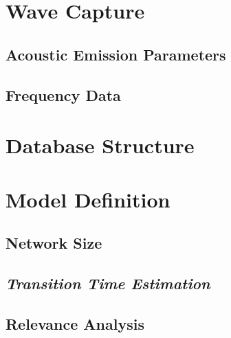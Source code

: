 \section{Wave Capture}
\subsection{Acoustic Emission Parameters}
\subsection{Frequency Data}

\section{Database Structure}

\section{Model Definition}

\subsection{Network Size}
\subsection{\textit{Transition Time Estimation}}
\subsection{Relevance Analysis}


